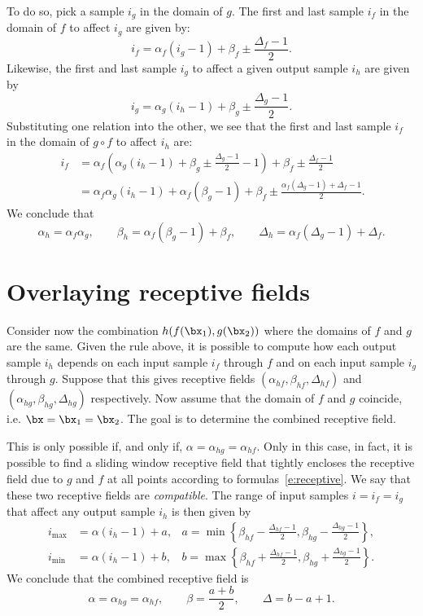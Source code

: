 To do so, pick a sample $i_g$ in the domain of $g$. The first and last sample $i_f$ in the domain of $f$ to affect $i_g$ are given by:
\[
  i_f = \alpha_f (i_g- 1) + \beta_f \pm \frac{\Delta_f - 1}{2}.
\]
Likewise, the first and last sample $i_g$ to affect a given output sample $i_h$ are given by
\[
  i_g = \alpha_g (i_h- 1) + \beta_g \pm \frac{\Delta_g - 1}{2}.
\]
Substituting one relation into the other, we see that the first and last sample $i_f$ in the domain of $g \circ f$ to affect $i_h$ are:
\begin{align*}\
 i_f &= \alpha_f \left(\alpha_g (i_h- 1) + \beta_g \pm \frac{\Delta_g - 1}{2} - 1\right) + \beta_f \pm \frac{\Delta_f - 1}{2}	
 \\
&= \alpha_f\alpha_g (i_h-1)
 + \alpha_f (\beta_g - 1) + \beta_f
 \pm \frac{\alpha_f (\Delta_g - 1) + \Delta_f -1}{2}.
\end{align*}
We conclude that
\[
\alpha_h = \alpha_f \alpha_g,
\qquad
\beta_h =  \alpha_f (\beta_g - 1) + \beta_f,
\qquad
\Delta_h = \alpha_f (\Delta_g - 1) + \Delta_f.
\]

\section{Overlaying receptive fields}\label{s:receptive-overlying}

Consider now the combination $h(f(\bx_1), g(\bx_2))$ where the domains of $f$ and $g$ are the same. Given the rule above, it is possible to compute how each output sample $i_h$ depends on each input sample $i_f$ through $f$ and on each input sample $i_g$ through $g$. Suppose that this gives receptive fields $(\alpha_{hf}, \beta_{hf}, \Delta_{hf})$ and $(\alpha_{hg}, \beta_{hg}, \Delta_{hg})$ respectively. Now assume that the domain of $f$ and $g$ coincide, i.e. $\bx = \bx_1 = \bx_2$. The goal is to determine the combined receptive field.

This is only possible if, and only if, $\alpha = \alpha_{hg} = \alpha_{hf}$. Only in this case, in fact, it is possible to find a sliding window receptive field that tightly encloses the receptive field due to $g$ and $f$ at all points according to formulas~\eqref{e:receptive}. We say that these two receptive fields are \emph{compatible}. The range of input samples $i = i_f = i_g$ that affect any output sample $i_h$ is then given by
\begin{align*}
	  i_\text{max}&=
  \alpha (i_h- 1) + a, & a = \min
  \left\{\beta_{hf}- \frac{\Delta_{hf} - 1}{2}, \beta_{hg} - \frac{\Delta_{hg} - 1}{2}\right\},
  \\
  	  i_\text{min} &=
  \alpha (i_h- 1) + b, & b = \max
  \left\{\beta_{hf}+ \frac{\Delta_{hf} - 1}{2}, \beta_{hg} + \frac{\Delta_{hg} - 1}{2}\right\}.
\end{align*}
We conclude that the combined receptive field is
\[
\alpha = \alpha_{hg} = \alpha_{hf},
\qquad
\beta = \frac{a+b}{2},
\qquad
\Delta = b - a + 1.
\]



